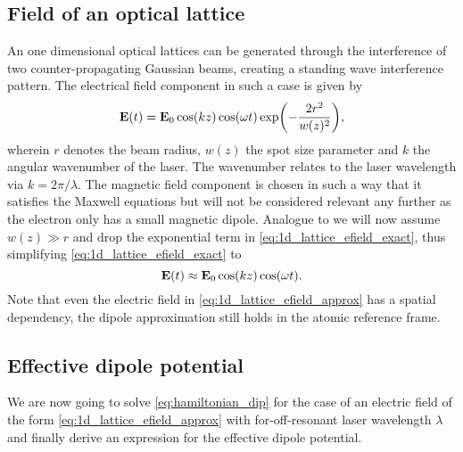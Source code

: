 \subsection{Field of an optical lattice}

An one dimensional optical lattices can be generated through the interference
of two counter-propagating Gaussian beams, creating a standing wave
interference pattern. The electrical field component in such a case is given
by
\begin{equation}
  \vb{E}(t)
  =\vb{E}_0\cos(kz)\cos(\omega t)\exp(-\frac{2r^2}{w(z)^2})
  \label{eq:1d_lattice_efield_exact},
\end{equation}
wherein $r$ denotes the beam radius, $w(z)$ the spot size parameter and $k$
the angular wavenumber of the laser. The wavenumber relates to the laser
wavelength via $k=2\pi/\lambda$. The magnetic field component is chosen
in such a way that it satisfies the Maxwell equations but will not be
considered relevant any further as the electron only has a small magnetic
dipole. Analogue to \cite{Rom2009} we will now assume $w(z)\gg r$ and drop
the exponential term in \cref{eq:1d_lattice_efield_exact}, thus simplifying
\cref{eq:1d_lattice_efield_exact} to
\begin{equation}
  \vb{E}(t)
  \approx\vb{E}_0\cos(kz)\cos(\omega t)
  \label{eq:1d_lattice_efield_approx}.
\end{equation}
Note that even the electric field in \cref{eq:1d_lattice_efield_approx} has
a spatial dependency, the dipole approximation still holds in the atomic
reference frame.

\subsection{Effective dipole potential}

We are now going to solve \cref{eq:hamiltonian_dip} for the case of an
electric field of the form \cref{eq:1d_lattice_efield_approx} with
for-off-resonant laser wavelength $\lambda$ and finally derive an expression
for the effective dipole potential.

